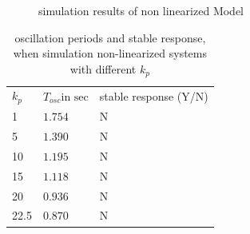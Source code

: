 \begin{figure}[H]
    \caption{simulation results of non linearized Model}
    \label{fig:prop_gain_non_linearized}
\end{figure}

\begin{table}[H]
\centering
\caption{oscillation periods and stable response, when simulation non-linearized systems with different $k_p$}
\label{tab:sim_res_non_linearized_kp}
\begin{tabular}{|l|l|l|}
\hline
\rowcolor[HTML]{C0C0C0} 
$k_p$ & $T_{osc} \text{in sec}$ & stable response (Y/N) \\ \Xhline{1pt}
1     & $1.754$                 & N                     \\ \hline
5     & $1.390$                 & N                     \\ \hline
10    & $1.195$                 & N                     \\ \hline
15    & $1.118$                 & N                     \\ \hline
20    & $0.936$                 & N                     \\ \hline
22.5  & $0.870$                 & N                     \\ \hline
\end{tabular}
\end{table}
